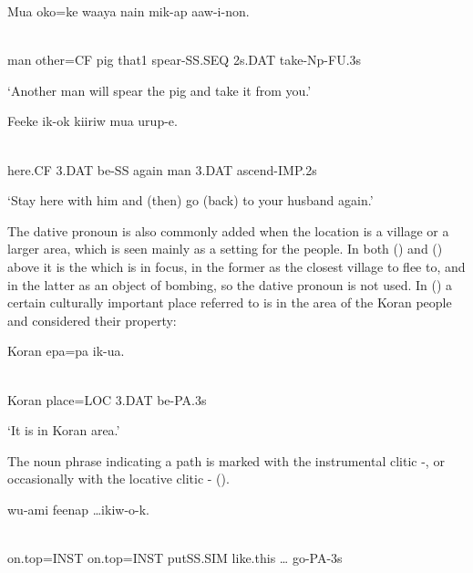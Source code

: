\ea%
\label{ex:x1061}
\gll Mua  oko=ke  waaya  nain  mik-ap   aaw-i-non. \\
      \\
\glt
\z

man  other=CF  pig  that1  spear-SS.SEQ  2s.DAT  take-Np-FU.3s

`Another man will spear the pig and take it from you.'

\ea%
\label{ex:x1939}
\gll Feeke    ik-ok  kiiriw  mua    urup-e. \\
      \\
\glt
\z

here.CF  3.DAT  be-SS  again  man  3.DAT  ascend-IMP.2s

`Stay here with him and (then) go (back) to your husband again.'

The dative pronoun is also commonly added when the location is a village or a larger area, which is seen mainly as a setting for the people. In both () and () above it is the  which is in focus, in the former as the closest village to flee to, and in the latter as an object of bombing, so the dative pronoun is not used. In () a certain culturally important place referred to is in the area of the Koran people and considered their property:

\ea%
\label{ex:x1801}
\gll Koran  epa=pa    ik-ua. \\
      \\
\glt
\z

Koran  place=LOC  3.DAT  be-PA.3s

`It is in Koran area.'

The noun phrase indicating a path is marked with the instrumental clitic -, or occasionally with the locative clitic - ().

\ea%
\label{ex:x866}
\gll {}  wu-ami  feenap  {\dots  ikiw-o-k.} \\
      \\
\glt
\z

on.top=INST  on.top=INST  putSS.SIM  like.this  {\dots}  go-PA-3s

